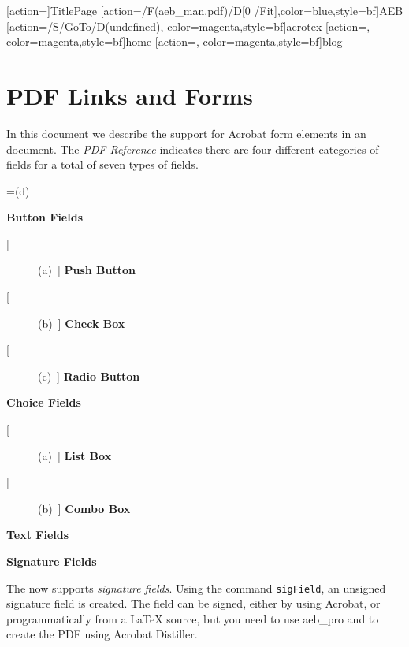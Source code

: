 \documentclass{article}
\makeatletter
\let\bslash=\@backslashchar
\let\app\textsf
\def\cs#1{\texttt{\bslash#1}}
\makeatother
\begin{document}
\maketitle

[action={}]{TitlePage}
[action={\GoToR/F(aeb_man.pdf)/D[0 /Fit]},color=blue,style={bf}]{AEB}
[action={/S/GoTo/D(undefined)},%
  color=magenta,style={bf}]{acrotex}
[action={},%
  color=magenta,style={bf}]{home}
[action={},%
  color=magenta,style={bf}]{blog}


\tableofcontents


\part{PDF Links and Forms}


In \hypertarget{eformsPkg}{this} document we describe the support for \app{Acrobat} form elements
in an {\cAcroT} document. The \textit{PDF Reference} indicates there
are four different categories of fields for a total of seven types
of fields.
\begin{questions}

=\hbox{(d)}
\def\I#1{\makebox[\wd0]{\color{blue}(\hfil#1\hfil)}\ }

    \item \textbf{Button Fields}
        \begin{description}
            \item[\I{a}] \textbf{Push Button}
            \item[\I{b}] \textbf{Check Box}
            \item[\I{c}] \textbf{Radio Button}
        \end{description}
    \item \textbf{Choice Fields}
        \begin{description}
            \item[\I{a}] \textbf{List Box}
            \item[\I{b}] \textbf{Combo Box}
        \end{description}
    \item \textbf{Text Fields}
    \item \textbf{Signature Fields}

\end{questions}
The {\cAcroB} now supports \textit{signature fields}. Using the
command \cs{sigField}, an unsigned signature field is created.
The field can be signed, either by using \app{Acrobat}, or programmatically
from a {\LaTeX} source, but you need to use \textsf{aeb\_pro} and to
create the PDF using \app{Acrobat} Distiller.
\end{document}

